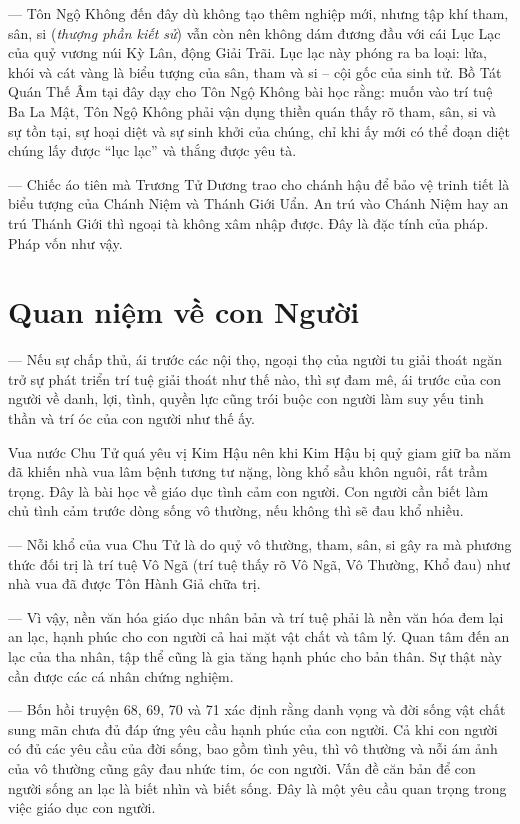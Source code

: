 --- Tôn Ngộ Không đến đây dù không tạo thêm nghiệp mới, nhưng tập khí tham, sân, si (\emph{thượng phần kiết sử}) vẫn còn nên không dám đương đầu với cái Lục Lạc của quỷ vương núi Kỳ Lân, động Giải Trãi. Lục lạc này phóng ra ba loại: lửa, khói và cát vàng là biểu tượng của sân, tham và si -- cội gốc của sinh tử. Bồ Tát Quán Thế Âm tại đây dạy cho Tôn Ngộ Không bài học rằng: muốn vào trí tuệ Ba La Mật, Tôn Ngộ Không phải vận dụng thiền quán thấy rõ tham, sân, si và sự tồn tại, sự hoại diệt và sự sinh khởi của chúng, chỉ khi ấy mới có thể đoạn diệt chúng lấy được ``lục lạc'' và thắng được yêu tà.

--- Chiếc áo tiên mà Trương Tử Dương trao cho chánh hậu để bảo vệ trinh tiết là biểu tượng của Chánh Niệm và Thánh Giới Uẩn. An trú vào Chánh Niệm hay an trú Thánh Giới thì ngoại tà không xâm nhập được. Đây là đặc tính của pháp. Pháp vốn như vậy.

\section{Quan niệm về con Người} %
\label{sec:68_69_con_nguoi}

--- Nếu sự chấp thủ, ái trước các nội thọ, ngoại thọ của người tu giải thoát ngăn trở sự phát triển trí tuệ giải thoát như thế nào, thì sự đam mê, ái trước của con người về danh, lợi, tình, quyền lực cũng trói buộc con người làm suy yếu tinh thần và trí óc của con người như thế ấy.

Vua nước Chu Tử quá yêu vị Kim Hậu nên khi Kim Hậu bị quỷ giam giữ ba năm đã khiến nhà vua lâm bệnh tương tư nặng, lòng khổ sầu khôn nguôi, rất trầm trọng. Đây là bài học về giáo dục tình cảm con người. Con người cần biết làm chủ tình cảm trước dòng sống vô thường, nếu không thì sẽ đau khổ nhiều.

--- Nỗi khổ của vua Chu Tử là do quỷ vô thường, tham, sân, si gây ra mà phương thức đối trị là trí tuệ Vô Ngã (trí tuệ thấy rõ Vô Ngã, Vô Thường, Khổ đau) như nhà vua đã được Tôn Hành Giả chữa trị.

--- Vì vậy, nền văn hóa giáo dục nhân bản và trí tuệ phải là nền văn hóa đem lại an lạc, hạnh phúc cho con người cả hai mặt vật chất và tâm lý. Quan tâm đến an lạc của tha nhân, tập thể cũng là gia tăng hạnh phúc cho bản thân. Sự thật này cần được các cá nhân chứng nghiệm.

--- Bốn hồi truyện 68, 69, 70 và 71 xác định rằng danh vọng và đời sống vật chất sung mãn chưa đủ đáp ứng yêu cầu hạnh phúc của con người. Cả khi con người có đủ các yêu cầu của đời sống, bao gồm tình yêu, thì vô thường và nỗi ám ảnh của vô thường cũng gây đau nhức tim, óc con người. Vấn đề căn bản để con người sống an lạc là biết nhìn và biết sống. Đây là một yêu cầu quan trọng trong việc giáo dục con người.

